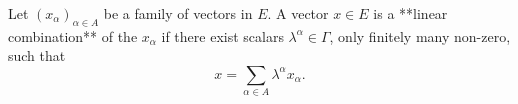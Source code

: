 Let $(x_\alpha)_{\alpha \in A}$ be a family of vectors in $E$. A vector $x \in E$ is a **linear combination** of the $x_\alpha$ if there exist scalars $\lambda^\alpha \in \Gamma$, only finitely many non-zero, such that
$$x = \sum_{\alpha \in A} \lambda^\alpha x_\alpha.$$
